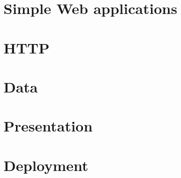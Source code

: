 \documentclass[10pt,twoside,english,showtrims]{support/latex/sbabook/sbabook}
\begin{document}
\mainmatter

\part{Simple Web applications}



\part{HTTP}






\part{Data}






\part{Presentation}





\part{Deployment}


\backmatter
\end{document}
